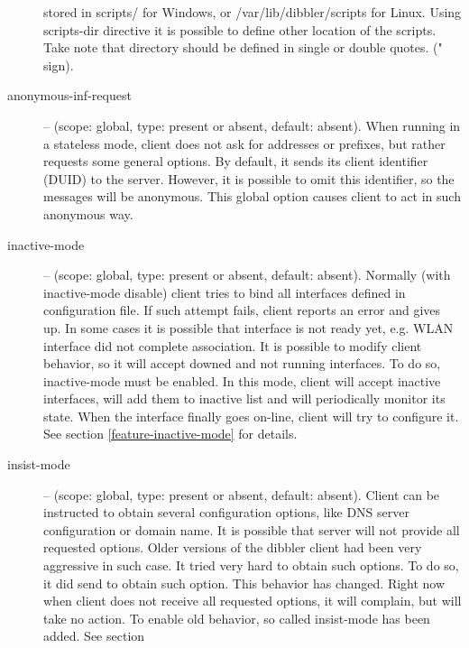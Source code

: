\begin{description}
            stored in scripts/ for Windows, or /var/lib/dibbler/scripts
            for Linux. Using scripts-dir directive it is possible to
            define other location of the scripts. Take note that
            directory should be defined in single or double quotes.
            (" sign).
\item[anonymous-inf-request] -- (scope: global, type: present or absent,
            default: absent). When running in a stateless mode, client
            does not ask for addresses or prefixes, but rather
            requests some general options. By default, it sends its
            client identifier (DUID) to the server. However, it is
            possible to omit this identifier, so the 
            messages will be anonymous. This global option causes
            client to act in such anonymous way.
 \item[inactive-mode] -- (scope: global, type: present or absent,
            default: absent). Normally (with inactive-mode disable)
            client tries to bind all interfaces defined in
            configuration file. If such attempt fails, client reports
            an error and gives up. In some cases it is possible that
            interface is not ready yet, e.g. WLAN interface did not
            complete association. It is possible to modify client
            behavior, so it will accept downed and not running
            interfaces. To do so, inactive-mode must be enabled. In
            this mode, client will accept inactive interfaces, will
            add them to inactive list and will periodically monitor
            its state. When the interface finally goes on-line, client
            will try to configure it. See section
            \ref{feature-inactive-mode} for details.
 \item[insist-mode] -- (scope: global, type: present or absent,
            default: absent). Client can be instructed to obtain
            several configuration options, like DNS server
            configuration or domain name. It is possible that server
            will not provide all requested options. Older versions of
            the dibbler client had been very aggressive in such
            case. It tried very hard to obtain such options. To do so,
            it did send  to obtain such option. This
            behavior has changed. Right now when client does not
            receive all requested options, it will complain, but will
            take no action. To enable old behavior, so called
            insist-mode has been added. See section

\end{description}
